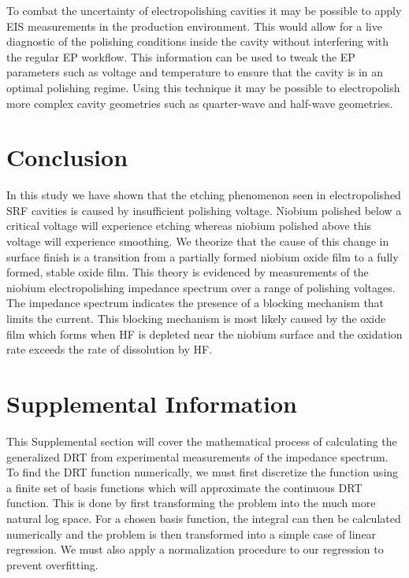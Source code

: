 To combat the uncertainty of electropolishing cavities it may be possible to apply EIS measurements in the production environment. This would allow for a live diagnostic of the polishing conditions inside the cavity without interfering with the regular EP workflow. This information can be used to tweak the EP parameters such as voltage and temperature to ensure that the cavity is in an optimal polishing regime. Using this technique it may be possible to electropolish more complex cavity geometries such as quarter-wave and half-wave geometries.



\section{Conclusion}
\label{sec:org57282ed}
In this study we have shown that the etching phenomenon seen in electropolished SRF cavities is caused by insufficient polishing voltage. Niobium polished below a critical voltage will experience etching whereas niobium polished above this voltage will experience smoothing. We theorize that the cause of this change in surface finish is a transition from a partially formed niobium oxide film to a fully formed, stable oxide film. This theory is evidenced by measurements of the niobium electropolishing impedance spectrum over a range of polishing voltages. The impedance spectrum indicates the presence of a blocking mechanism that limits the current. This blocking mechanism is most likely caused by the oxide film which forms when HF is depleted near the niobium surface and the oxidation rate exceeds the rate of dissolution by HF.


\section{Supplemental Information}
\label{sec:sup}

This Supplemental section will cover the mathematical process of calculating the generalized DRT from experimental measurements of the impedance spectrum. To find the DRT function numerically, we must first discretize the function using a finite set of basis functions which will approximate the continuous DRT function. This is done by first transforming the problem into the much more natural log space. For a chosen basis function, the integral can then be calculated numerically and the problem is then transformed into a simple case of linear regression. We must also apply a normalization procedure to our regression to prevent overfitting.


